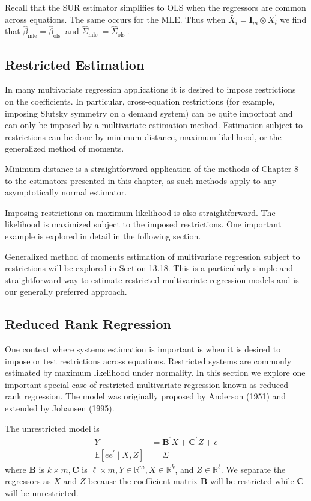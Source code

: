 \documentclass[10pt]{article}
\begin{document}
Recall that the SUR estimator simplifies to OLS when the regressors are common across equations. The same occurs for the MLE. Thus when $\bar{X}_{i}=\boldsymbol{I}_{m} \otimes X_{i}^{\prime}$ we find that $\widehat{\beta}_{\mathrm{mle}}=\widehat{\beta}_{\text {ols }}$ and $\widehat{\Sigma}_{\text {mle }}=\widehat{\Sigma}_{\text {ols }}$.

\subsection{Restricted Estimation}
In many multivariate regression applications it is desired to impose restrictions on the coefficients. In particular, cross-equation restrictions (for example, imposing Slutsky symmetry on a demand system) can be quite important and can only be imposed by a multivariate estimation method. Estimation subject to restrictions can be done by minimum distance, maximum likelihood, or the generalized method of moments.

Minimum distance is a straightforward application of the methods of Chapter 8 to the estimators presented in this chapter, as such methods apply to any asymptotically normal estimator.

Imposing restrictions on maximum likelihood is also straightforward. The likelihood is maximized subject to the imposed restrictions. One important example is explored in detail in the following section.

Generalized method of moments estimation of multivariate regression subject to restrictions will be explored in Section 13.18. This is a particularly simple and straightforward way to estimate restricted multivariate regression models and is our generally preferred approach.

\subsection{Reduced Rank Regression}
One context where systems estimation is important is when it is desired to impose or test restrictions across equations. Restricted systems are commonly estimated by maximum likelihood under normality. In this section we explore one important special case of restricted multivariate regression known as reduced rank regression. The model was originally proposed by Anderson (1951) and extended by Johansen (1995).

The unrestricted model is
$$
\begin{aligned}
Y &=\boldsymbol{B}^{\prime} X+\boldsymbol{C}^{\prime} Z+e \\
\mathbb{E}\left[e e^{\prime} \mid X, Z\right] &=\Sigma
\end{aligned}
$$
where $\boldsymbol{B}$ is $k \times m, \boldsymbol{C}$ is $\ell \times m, Y \in \mathbb{R}^{m}, X \in \mathbb{R}^{k}$, and $Z \in \mathbb{R}^{\ell}$. We separate the regressors as $X$ and $Z$ because the coefficient matrix $\boldsymbol{B}$ will be restricted while $\boldsymbol{C}$ will be unrestricted.
\end{document}
